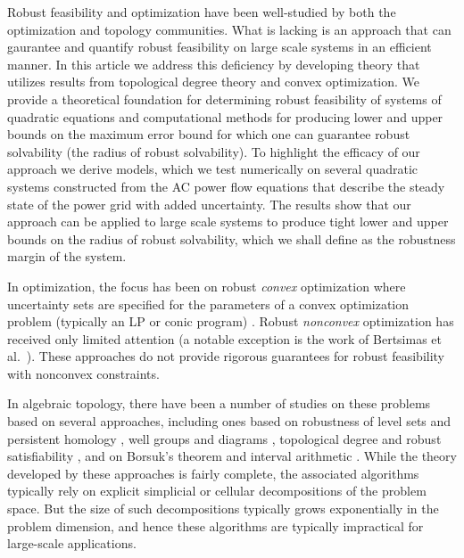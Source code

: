   
Robust feasibility and optimization have been well-studied by both the optimization and topology communities. 
What is lacking is an approach that can gaurantee and quantify robust feasibility on large scale systems in an efficient manner. 
In this article we address this deficiency by developing theory that utilizes results from topological degree theory and convex optimization. 
We provide a theoretical foundation for determining robust feasibility of systems of quadratic equations and computational methods for producing lower and upper bounds on the maximum error bound for which one can guarantee robust solvability (the radius of robust solvability). 
To highlight the efficacy of our approach we derive models, which we test numerically on several quadratic systems constructed from the AC power flow equations that describe the steady state of the power grid with added uncertainty. 
The results show that our approach can be applied to large scale systems to produce tight lower and upper bounds on the radius of robust solvability, which we shall define as the robustness margin of the system.

In optimization, the focus has been on robust \emph{convex} optimization where uncertainty sets are specified for the parameters of a convex optimization problem (typically an LP or conic program) \cite{ben2009robust}.
Robust \emph{nonconvex} optimization has received only limited attention (a notable exception is the work of Bertsimas et al.~\cite{BeNoTe2010}).
These approaches do not provide rigorous guarantees for robust feasibility with nonconvex constraints.

In algebraic topology, there have been a number of studies on these problems based on several approaches, including ones based on robustness of level sets and persistent homology \cite{BeEdMoPa2010,EdMoPa2011}, well groups and diagrams \cite{ChSkPa2012,FrKr2016well,FrKr2016pers}, topological degree and robust satisfiability \cite{FrKr2015,FrKrWa2016},  and on Borsuk's theorem and interval arithmetic \cite{FrRa2015,FrHoLa2007,FrLa2005}.
While the theory developed by these approaches is fairly complete, the associated algorithms typically rely on explicit simplicial or cellular decompositions of the problem space.
But the size of such decompositions typically grows exponentially in the problem dimension, and hence these algorithms are typically impractical for large-scale applications.

